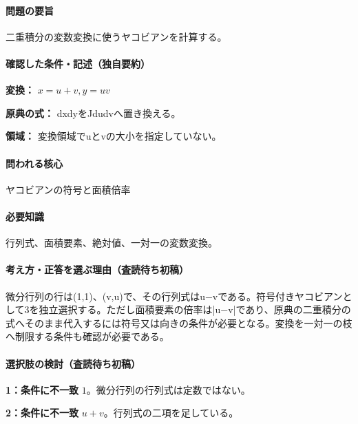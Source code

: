 \paragraph{問題の要旨} 二重積分の変数変換に使うヤコビアンを計算する。

\paragraph{確認した条件・記述（独自要約）}\mbox{}\par

\noindent\textbf{変換：} \(x=u+v,y=uv\)\par

\noindent\textbf{原典の式：} dxdyをJdudvへ置き換える。\par

\noindent\textbf{領域：} 変換領域でuとvの大小を指定していない。\par

\paragraph{問われる核心} ヤコビアンの符号と面積倍率

\paragraph{必要知識} 行列式、面積要素、絶対値、一対一の変数変換。

\paragraph{考え方・正答を選ぶ理由（査読待ち初稿）} 微分行列の行は(1,1)、(v,u)で、その行列式はu−vである。符号付きヤコビアンとして3を独立選択する。ただし面積要素の倍率は|u−v|であり、原典の二重積分の式へそのまま代入するには符号又は向きの条件が必要となる。変換を一対一の枝へ制限する条件も確認が必要である。

\paragraph{選択肢の検討（査読待ち初稿）}\mbox{}\par

\noindent\textbf{1：条件に不一致} \(1\)。微分行列の行列式は定数ではない。\par

\noindent\textbf{2：条件に不一致} \(u+v\)。行列式の二項を足している。\par

